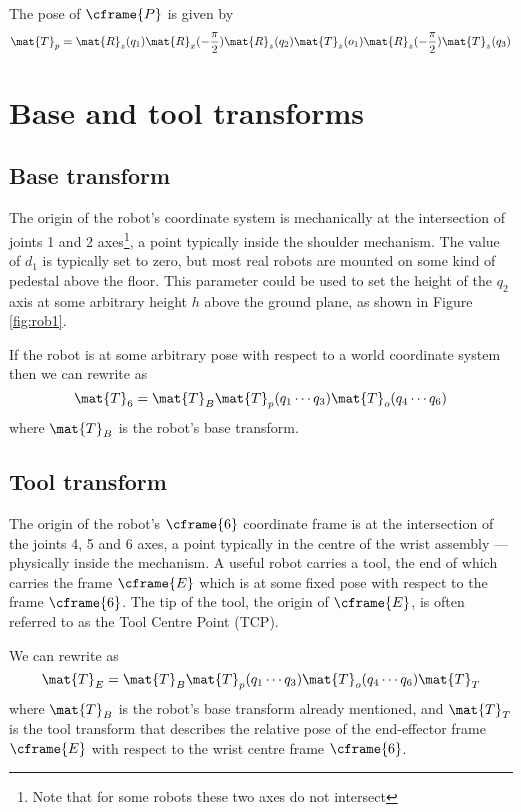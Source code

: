 \documentclass[11pt]{article}
\numberwithin{equation}{section}
\begin{document}
The pose of $\cframe{P}$ is given by
\[
\mat{T}_p = \mat{R}_z(q_1) \mat{R}_x(-\frac{\pi}{2}) \mat{R}_z(q_2)  \mat{T}_z(o_1)  \mat{R}_z(-\frac{\pi}{2}) \mat{T}_z(q_3)
\]

\section{Base and tool transforms}

\subsection{Base transform}
The origin of the robot's coordinate system is mechanically at the intersection of joints 1 and 2 axes\footnote{Note that for some robots these two axes do not intersect}, a point typically inside the shoulder mechanism.
The value of $d_1$ is typically set to zero, but most real robots are mounted on some kind of pedestal above the floor.
This parameter could be used to set the height of the $q_2$ axis at some arbitrary height $h$ above the
ground plane, as shown in Figure  \ref{fig:rob1}.

If the robot is at some arbitrary pose with respect to a world coordinate system then we can rewrite  as
\[
\mat{T}_6 = \mat{T}_B \mat{T}_p(q_1 \cdots q_3) \mat{T}_o(q_4 \cdots q_6) 
\]
where $\mat{T}_B$ is the robot's base transform.

\subsection{Tool transform}
The origin of the robot's $\cframe{6}$ coordinate frame is at the intersection of the joints 4, 5 and 6 axes, a point typically in the centre of the wrist assembly --- physically inside the mechanism.
A useful robot carries a tool, the end of which carries the frame $\cframe{E}$ which 
is at some fixed pose with respect to the  frame $\cframe{6}$.  The tip of the tool, the origin of $\cframe{E}$, is often referred to as the Tool Centre Point (TCP).

We can rewrite  as
\[
\mat{T}_E = \mat{T}_B \mat{T}_p(q_1 \cdots q_3) \mat{T}_o(q_4 \cdots q_6)  \mat{T}_T
\]
where $\mat{T}_B$ is the robot's base transform already mentioned, and $ \mat{T}_T$ is the tool transform that describes the relative pose of the 
end-effector frame $\cframe{E}$ with respect to the wrist centre frame $\cframe{6}$.


\end{document}
